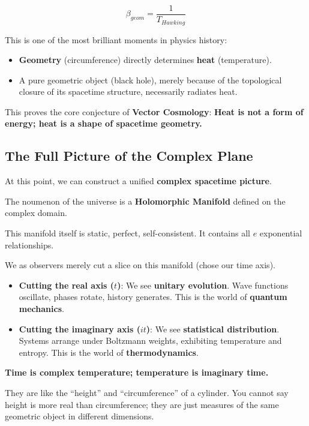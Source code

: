 \documentclass[11pt,a4paper,twoside]{book}
\begin{document}
$$\beta_{geom} = \frac{1}{T_{Hawking}}$$

This is one of the most brilliant moments in physics history:

\begin{itemize}
\item \textbf{Geometry} (circumference) directly determines \textbf{heat} (temperature).

\item A pure geometric object (black hole), merely because of the topological closure of its spacetime structure, necessarily radiates heat.
\end{itemize}

This proves the core conjecture of \textbf{Vector Cosmology}: \textbf{Heat is not a form of energy; heat is a shape of spacetime geometry.}

\subsection{The Full Picture of the Complex Plane}

At this point, we can construct a unified \textbf{complex spacetime picture}.

The noumenon of the universe is a \textbf{Holomorphic Manifold} defined on the complex domain.

This manifold itself is static, perfect, self-consistent. It contains all $e$ exponential relationships.

We as observers merely cut a slice on this manifold (chose our time axis).

\begin{itemize}
\item \textbf{Cutting the real axis ($t$)}: We see \textbf{unitary evolution}. Wave functions oscillate, phases rotate, history generates. This is the world of \textbf{quantum mechanics}.

\item \textbf{Cutting the imaginary axis ($it$)}: We see \textbf{statistical distribution}. Systems arrange under Boltzmann weights, exhibiting temperature and entropy. This is the world of \textbf{thermodynamics}.
\end{itemize}

\textbf{Time is complex temperature; temperature is imaginary time.}

They are like the ``height'' and ``circumference'' of a cylinder. You cannot say height is more real than circumference; they are just measures of the same geometric object in different dimensions.
\end{document}
